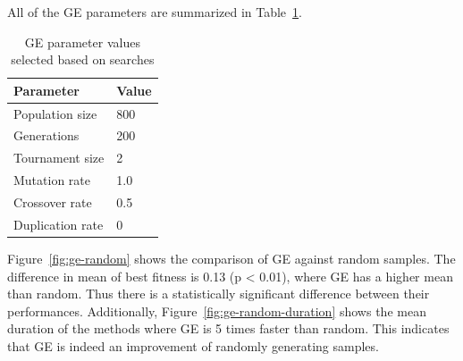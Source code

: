 All of the GE parameters are summarized in Table~\ref{tab:ge-parameters}.

\begin{table}
    \centering
    \begin{tabular}{| l | l |}
    \hline
    \textbf{Parameter} & \textbf{Value} \\ \hline
    Population size & 800 \\
    \hline
    Generations & 200 \\
    \hline
    Tournament size & 2 \\
    \hline
    Mutation rate & 1.0 \\
    \hline
    Crossover rate & 0.5 \\
    \hline
    Duplication rate & 0 \\
    \hline
    \end{tabular}
    \caption{GE parameter values selected based on searches}
    \label{tab:ge-parameters}
\end{table}

Figure~\ref{fig:ge-random} shows the comparison of GE against random samples.
The difference in mean of best fitness is 0.13 (p < 0.01), where GE has a higher mean than random.
Thus there is a statistically significant difference between their performances.
Additionally, Figure~\ref{fig:ge-random-duration} shows the mean duration of the methods where GE is 5 times faster than random.
This indicates that GE is indeed an improvement of randomly generating samples.

